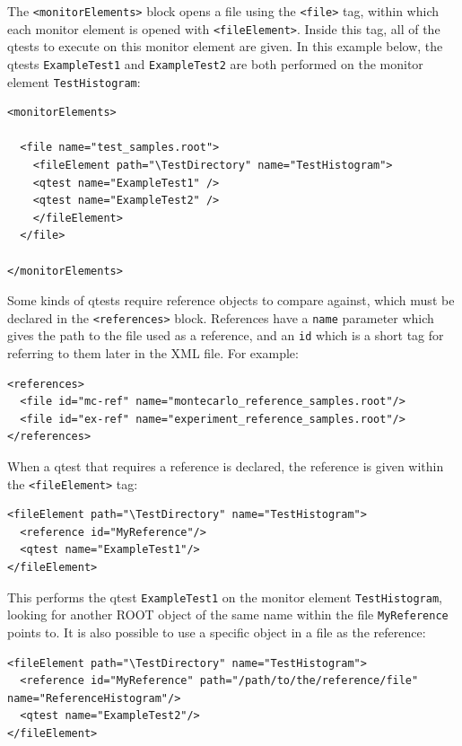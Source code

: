 The \texttt{<monitorElements>} block opens a file using the \texttt{<file>} tag, within which each monitor element is opened with \texttt{<fileElement>}. Inside this tag, all of the qtests to execute on this monitor element are given. In this example below, the qtests \texttt{ExampleTest1} and \texttt{ExampleTest2} are both performed on the monitor element \texttt{TestHistogram}:

\begin{verbatim}
<monitorElements>

  <file name="test_samples.root">
    <fileElement path="\TestDirectory" name="TestHistogram">
    <qtest name="ExampleTest1" />
    <qtest name="ExampleTest2" />
    </fileElement>
  </file>

</monitorElements>
\end{verbatim}

Some kinds of qtests require reference objects to compare against, which must be declared in the \texttt{<references>} block. References have a \texttt{name} parameter which gives the path to the file used as a reference, and an \texttt{id} which is a short tag for referring to them later in the XML file. For example:

\begin{verbatim}
<references>
  <file id="mc-ref" name="montecarlo_reference_samples.root"/>
  <file id="ex-ref" name="experiment_reference_samples.root"/>
</references>
\end{verbatim}

When a qtest that requires a reference is declared, the reference is given within the \texttt{<fileElement>} tag:

\begin{verbatim}
<fileElement path="\TestDirectory" name="TestHistogram">
  <reference id="MyReference"/>
  <qtest name="ExampleTest1"/>
</fileElement>
\end{verbatim}

This performs the qtest \texttt{ExampleTest1} on the monitor element \texttt{TestHistogram}, looking for another ROOT object of the same name within the file \texttt{MyReference} points to. It is also possible to use a specific object in a file as the reference:

\begin{verbatim}
<fileElement path="\TestDirectory" name="TestHistogram">
  <reference id="MyReference" path="/path/to/the/reference/file" name="ReferenceHistogram"/>
  <qtest name="ExampleTest2"/>
</fileElement>
\end{verbatim}

